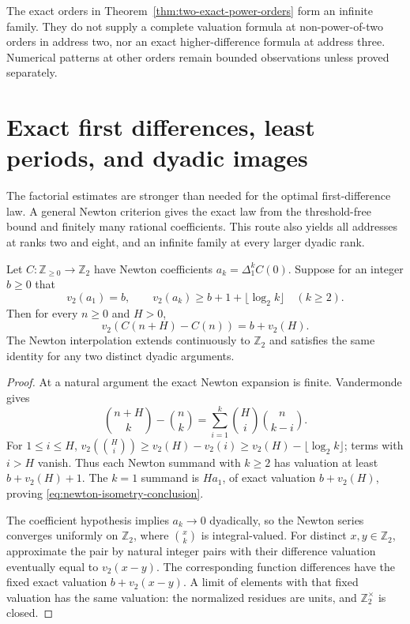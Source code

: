 \begin{remark}
The exact orders in Theorem~\ref{thm:two-exact-power-orders} form an
infinite family. They do not supply a complete valuation formula at
non-power-of-two orders in address two, nor an exact higher-difference
formula at address three. Numerical patterns at other orders remain
bounded observations unless proved separately.
\end{remark}

\section{Exact first differences, least periods, and dyadic images}
\label{sec:sharp-periods-final}

The factorial estimates are stronger than needed for the optimal
first-difference law. A general Newton criterion gives the exact law
from the threshold-free bound and finitely many rational coefficients.
This route also yields all addresses at ranks two and eight, and an
infinite family at every larger dyadic rank.

\begin{lemma}
\label{lem:newton-exact-isometry-criterion}
Let $C:\mathbb Z_{\geq0}\to\mathbb Z_2$ have Newton coefficients
$a_k=\Delta_1^kC(0)$. Suppose for an integer $b\geq0$ that
\begin{equation}
 v_2(a_1)=b,\qquad
 v_2(a_k)\geq b+1+\lfloor\log_2k\rfloor\quad(k\geq2).
 \label{eq:newton-isometry-criterion}
\end{equation}
Then for every $n\geq0$ and $H>0$,
\begin{equation}
 v_2(C(n+H)-C(n))=b+v_2(H).
 \label{eq:newton-isometry-conclusion}
\end{equation}
The Newton interpolation extends continuously to $\mathbb Z_2$ and
satisfies the same identity for any two distinct dyadic arguments.
\end{lemma}

\begin{proof}
At a natural argument the exact Newton expansion is finite.
Vandermonde gives
\[
 \binom{n+H}{k}-\binom nk
   =\sum_{i=1}^k\binom Hi\binom n{k-i}.
\]
For $1\leq i\leq H$,
$v_2(\binom Hi)\geq v_2(H)-v_2(i)
 \geq v_2(H)-\lfloor\log_2k\rfloor$; terms with $i>H$ vanish.
Thus each Newton summand with $k\geq2$ has valuation at least
$b+v_2(H)+1$. The $k=1$ summand is $Ha_1$, of exact valuation
$b+v_2(H)$, proving \eqref{eq:newton-isometry-conclusion}.

The coefficient hypothesis implies $a_k\to0$ dyadically, so the
Newton series converges uniformly on $\mathbb Z_2$, where
$\binom xk$ is integral-valued. For distinct $x,y\in\mathbb Z_2$,
approximate the pair by natural integer pairs with their difference
valuation eventually equal to $v_2(x-y)$. The corresponding function
differences have the fixed exact valuation $b+v_2(x-y)$.
A limit of elements with that fixed valuation has the same valuation:
the normalized residues are units, and $\mathbb Z_2^\times$ is closed.
\end{proof}

